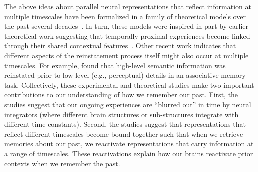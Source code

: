 \documentclass{article}
\begin{document}
The above ideas about parallel neural representations that reflect information at multiple timescales have been formalized in a family of theoretical models over the past several decades~\citep{HowaKaha02a, DianEtal07, SedeEtal08, PolyEtal09, ShanEtal09, ShanHowa10, ShanHowa12, HowaEtal14, Rang18}.  In turn, these models were inspired in part by earlier theoretical work suggesting that temporally proximal experiences become linked through their shared contextual features~\citep{Este55a,AtkiShif68}.  Other recent work indicates that different aspects of the reinstatement process itself might also occur at multiple timescales.  For example, \cite{LindEtal19} found that high-level semantic information was reinstated prior to low-level (e.g., perceptual) details in an associative memory task.  Collectively, these experimental and theoretical studies make two important contributions to our understanding of how we remember our past.  First, the studies suggest that our ongoing experiences are ``blurred out'' in time by neural integrators (where different brain structures or sub-structures integrate with different time constants).  Second, the studies suggest that representations that reflect different timescales become bound together such that when we retrieve memories about our past, we reactivate representations that carry information at a range of timescales.  These reactivations explain how our brains reactivate prior contexts when we remember the past.
\end{document}

